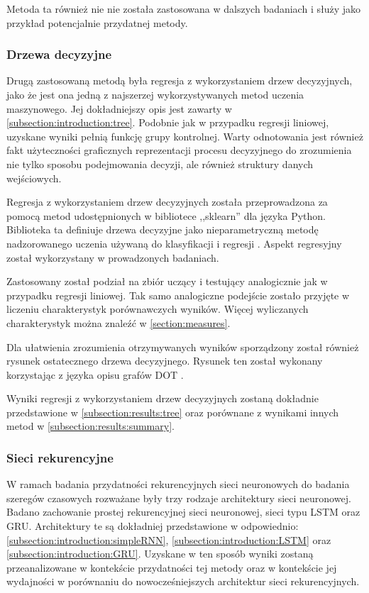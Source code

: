 \documentclass[10pt,a4paper]{article}
\begin{document}
Metoda ta również nie nie została zastosowana w dalszych badaniach i służy jako przykład potencjalnie przydatnej metody.

\subsubsection{Drzewa decyzyjne}
Drugą zastosowaną metodą była regresja z wykorzystaniem drzew decyzyjnych, jako że jest ona jedną z najszerzej wykorzystywanych metod uczenia maszynowego. Jej dokładniejszy opis jest zawarty w \autoref{subsection:introduction:tree}. Podobnie jak w przypadku regresji liniowej, uzyskane wyniki pełnią funkcję grupy kontrolnej. Warty odnotowania jest również fakt użyteczności graficznych reprezentacji procesu decyzyjnego do zrozumienia nie tylko sposobu podejmowania decyzji, ale również struktury danych wejściowych. 

Regresja z wykorzystaniem drzew decyzyjnych została przeprowadzona za pomocą metod udostępnionych w bibliotece ,,sklearn'' dla języka Python. Biblioteka ta definiuje drzewa decyzyjne jako nieparametryczną metodę nadzorowanego uczenia używaną do klasyfikacji i regresji \cite{sklearnDecissionTrees}. Aspekt regresyjny został wykorzystany w prowadzonych badaniach. 

Zastosowany został podział na zbiór uczący i testujący analogicznie jak w przypadku regresji liniowej. Tak samo analogiczne podejście zostało przyjęte w liczeniu charakterystyk porównawczych wyników. Więcej wyliczanych charakterystyk można znaleźć w \autoref{section:measures}.

Dla ułatwienia zrozumienia otrzymywanych wyników sporządzony został również rysunek ostatecznego drzewa decyzyjnego. Rysunek ten został wykonany korzystając z języka opisu grafów DOT \cite{dotLanguage}.

Wyniki regresji z wykorzystaniem drzew decyzyjnych zostaną dokładnie przedstawione w \autoref{subsection:results:tree} oraz porównane z wynikami innych metod w \autoref{subsection:results:summary}.

\subsubsection{Sieci rekurencyjne}
\label{subsection:research:RNN}
W ramach badania przydatności rekurencyjnych sieci neuronowych do badania szeregów czasowych rozważane były trzy rodzaje architektury sieci neuronowej. Badano zachowanie prostej rekurencyjnej sieci neuronowej, sieci typu LSTM oraz GRU. Architektury te są dokładniej przedstawione w odpowiednio: \autoref{subsection:introduction:simpleRNN}, \autoref{subsection:introduction:LSTM} oraz \autoref{subsection:introduction:GRU}. Uzyskane w ten sposób wyniki zostaną przeanalizowane w kontekście przydatności tej metody oraz w kontekście jej wydajności w porównaniu do nowocześniejszych architektur sieci rekurencyjnych. 
\end{document}
